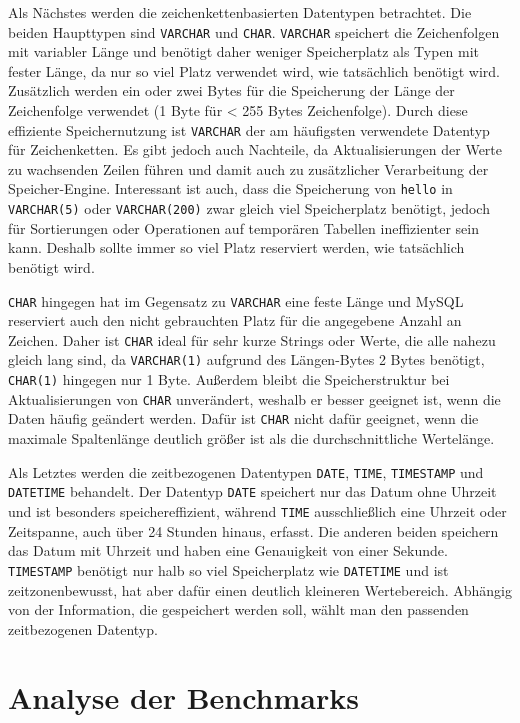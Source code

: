 Als Nächstes werden die zeichenkettenbasierten Datentypen betrachtet.
Die beiden Haupttypen sind \texttt{VARCHAR} und \texttt{CHAR}.
\texttt{VARCHAR} speichert die Zeichenfolgen mit variabler Länge und benötigt daher weniger Speicherplatz als Typen mit fester Länge, da nur so viel Platz verwendet wird, wie tatsächlich benötigt wird.
Zusätzlich werden ein oder zwei Bytes für die Speicherung der Länge der Zeichenfolge verwendet (1 Byte für < 255 Bytes Zeichenfolge).
Durch diese effiziente Speichernutzung ist \texttt{VARCHAR} der am häufigsten verwendete Datentyp für Zeichenketten.
Es gibt jedoch auch Nachteile, da Aktualisierungen der Werte zu wachsenden Zeilen führen und damit auch zu zusätzlicher Verarbeitung der Speicher-Engine.
Interessant ist auch, dass die Speicherung von \texttt{hello} in \texttt{VARCHAR(5)} oder \texttt{VARCHAR(200)} zwar gleich viel Speicherplatz benötigt, jedoch für Sortierungen oder Operationen auf temporären Tabellen ineffizienter sein kann.
Deshalb sollte immer so viel Platz reserviert werden, wie tatsächlich benötigt wird.

\texttt{CHAR} hingegen hat im Gegensatz zu \texttt{VARCHAR} eine feste Länge und MySQL reserviert auch den nicht gebrauchten Platz für die angegebene Anzahl an Zeichen.
Daher ist \texttt{CHAR} ideal für sehr kurze Strings oder Werte, die alle nahezu gleich lang sind, da \texttt{VARCHAR(1)} aufgrund des Längen-Bytes 2 Bytes benötigt, \texttt{CHAR(1)} hingegen nur 1 Byte.
Außerdem bleibt die Speicherstruktur bei Aktualisierungen von \texttt{CHAR} unverändert, weshalb er besser geeignet ist, wenn die Daten häufig geändert werden.
Dafür ist \texttt{CHAR} nicht dafür geeignet, wenn die maximale Spaltenlänge deutlich größer ist als die durchschnittliche Wertelänge.

Als Letztes werden die zeitbezogenen Datentypen \texttt{DATE}, \texttt{TIME}, \texttt{TIMESTAMP} und \texttt{DATETIME} behandelt.
Der Datentyp \texttt{DATE} speichert nur das Datum ohne Uhrzeit und ist besonders speichereffizient, während \texttt{TIME} ausschließlich eine Uhrzeit oder Zeitspanne, auch über 24 Stunden hinaus, erfasst.
Die anderen beiden speichern das Datum mit Uhrzeit und haben eine Genauigkeit von einer Sekunde.
\texttt{TIMESTAMP} benötigt nur halb so viel Speicherplatz wie \texttt{DATETIME} und ist zeitzonenbewusst, hat aber dafür einen deutlich kleineren Wertebereich.
Abhängig von der Information, die gespeichert werden soll, wählt man den passenden zeitbezogenen Datentyp.

\section{Analyse der Benchmarks}\label{sec:data-types-analyse-der-benchmarks}

